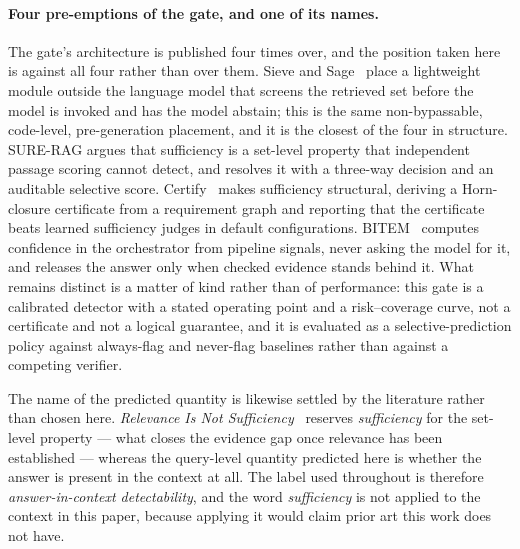 \documentclass[preprint,3p,times]{elsarticle}
\begin{document}
\paragraph{Four pre-emptions of the gate, and one of its names.}
The gate's architecture is published four times over, and the position taken
here is against all four rather than over them. Sieve and
Sage~\cite{won2026sievesage} place a lightweight module outside the language
model that screens the retrieved set before the model is invoked and has the
model abstain; this is the same non-bypassable, code-level, pre-generation
placement, and it is the closest of the four in structure. SURE-RAG
\cite{qiu2026surerag} argues that sufficiency is a set-level property that
independent passage scoring cannot detect, and resolves it with a three-way
decision and an auditable selective score. Certify~\cite{zhang2026certify}
makes sufficiency structural, deriving a Horn-closure certificate from a
requirement graph and reporting that the certificate beats learned sufficiency
judges in default configurations. BITEM~\cite{knafou2026bitem} computes
confidence in the orchestrator from pipeline signals, never asking the model
for it, and releases the answer only when checked evidence stands behind it.
What remains distinct is a matter of kind rather than of performance: this
gate is a calibrated detector with a stated operating point and a
risk--coverage curve, not a certificate and not a logical guarantee, and it is
evaluated as a selective-prediction policy against always-flag and never-flag
baselines rather than against a competing verifier.

The name of the predicted quantity is likewise settled by the literature
rather than chosen here. \emph{Relevance Is Not Sufficiency}~\cite{li2026relevance}
reserves \emph{sufficiency} for the set-level property --- what closes the
evidence gap once relevance has been established --- whereas the query-level
quantity predicted here is whether the answer is present in the context at
all. The label used throughout is therefore \emph{answer-in-context
detectability}, and the word \emph{sufficiency} is not applied to the context
in this paper, because applying it would claim prior art this work does not
have.
\end{document}
